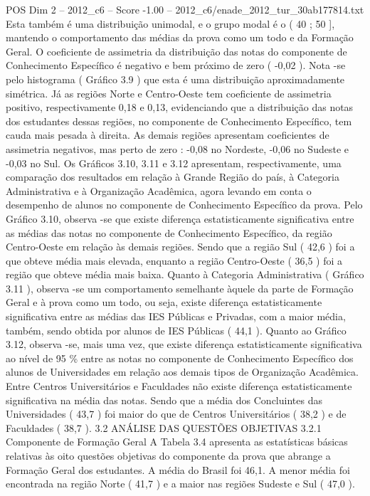 \begin{textsample}{POS Dim 2 – 2012\_c6 – Score -1.00 – 2012\_c6/enade\_2012\_tur\_30ab177814.txt}
Esta também é uma distribuição unimodal, e o grupo modal é o ( 40 ; 50 ], mantendo o comportamento das médias da prova como um todo e da Formação Geral.
O coeficiente de assimetria da distribuição das notas do componente de Conhecimento Específico é negativo e bem próximo de zero ( -0,02 ).
Nota -se pelo histograma ( Gráfico 3.9 ) que esta é uma distribuição aproximadamente simétrica.
Já as regiões Norte e Centro-Oeste tem coeficiente de assimetria positivo, respectivamente 0,18 e 0,13, evidenciando que a distribuição das notas dos estudantes dessas regiões, no componente de Conhecimento Específico, tem cauda mais pesada à direita.
As demais regiões apresentam coeficientes de assimetria negativos, mas perto de zero : -0,08 no Nordeste, -0,06 no Sudeste e -0,03 no Sul.
Os Gráficos 3.10, 3.11 e 3.12 apresentam, respectivamente, uma comparação dos resultados em relação à Grande Região do país, à Categoria Administrativa e à Organização Acadêmica, agora levando em conta o desempenho de alunos no componente de Conhecimento Específico da prova.
Pelo Gráfico 3.10, observa -se que existe diferença estatisticamente significativa entre as médias das notas no componente de Conhecimento Específico, da região Centro-Oeste em relação às demais regiões.
Sendo que a região Sul ( 42,6 ) foi a que obteve média mais elevada, enquanto a região Centro-Oeste ( 36,5 ) foi a região que obteve média mais baixa.
Quanto à Categoria Administrativa ( Gráfico 3.11 ), observa -se um comportamento semelhante àquele da parte de Formação Geral e à prova como um todo, ou seja, existe diferença estatisticamente significativa entre as médias das IES Públicas e Privadas, com a maior média, também, sendo obtida por alunos de IES Públicas ( 44,1 ).
Quanto ao Gráfico 3.12, observa -se, mais uma vez, que existe diferença estatisticamente significativa ao nível de 95 \% entre as notas no componente de Conhecimento Específico dos alunos de Universidades em relação aos demais tipos de Organização Acadêmica.
Entre Centros Universitários e Faculdades não existe diferença estatisticamente significativa na média das notas.
Sendo que a média dos Concluintes das Universidades ( 43,7 ) foi maior do que de Centros Universitários ( 38,2 ) e de Faculdades ( 38,7 ). 3.2 ANÁLISE DAS QUESTÕES OBJETIVAS 3.2.1 Componente de Formação Geral A Tabela 3.4 apresenta as estatísticas básicas relativas às oito questões objetivas do componente da prova que abrange a Formação Geral dos estudantes.
A média do Brasil foi 46,1.
A menor média foi encontrada na região Norte ( 41,7 ) e a maior nas regiões Sudeste e Sul ( 47,0 ).

\end{textsample}

